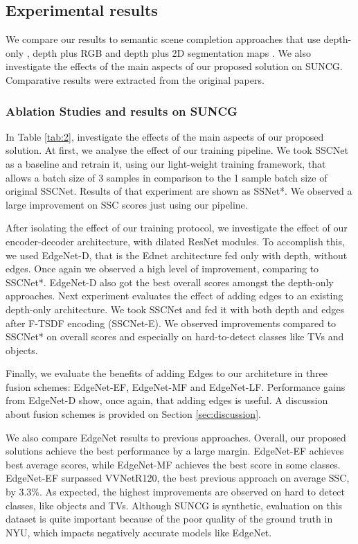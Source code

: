 \subsection{Experimental results}

We compare our results to semantic scene completion approaches that use depth-only \cite{guo_view-volume_2018,song_semantic_2017,zhang_semantic_2018}, depth plus RGB \cite{guedes_semantic_2018} and depth plus 2D segmentation maps \cite{garbade_two_2018,See_and_think_2018}. We also investigate the effects of the main aspects of our proposed solution on SUNCG. Comparative results were extracted from the original papers.

\subsubsection {Ablation Studies and results on SUNCG}

 In Table \ref{tab:2}, investigate the effects of the main aspects of our proposed solution. At first, we analyse the effect of our training pipeline. We took SSCNet as a baseline and retrain it, using our light-weight training framework, that allows a batch size of 3 samples in comparison to the 1 sample batch size of original SSCNet. Results of that experiment are shown as SSNet*. We observed a large improvement on SSC scores just using our pipeline.

After isolating the effect of our training protocol, we investigate the effect of our encoder-decoder architecture, with dilated ResNet modules. To accomplish this, we used EdgeNet-D, that is the Ednet architecture fed only with depth, without edges. Once again we observed a high level of improvement, comparing to SSCNet*. EdgeNet-D also got the best overall scores amongst the depth-only approaches. Next experiment evaluates the effect of adding edges to an existing depth-only architecture. We took SSCNet and fed it with both depth and edges after F-TSDF encoding (SSCNet-E). We observed improvements compared to SSCNet* on overall scores and especially on hard-to-detect classes like TVs and objects.

Finally, we evaluate the benefits of adding Edges to our architeture in three fusion schemes: EdgeNet-EF, EdgeNet-MF and EdgeNet-LF.  Performance gains from EdgeNet-D show, once again, that adding edges is useful. A discussion about fusion schemes is provided on Section \ref{sec:discussion}. 

We also compare EdgeNet results to previous approaches. Overall, our proposed solutions achieve the best performance by a large margin. EdgeNet-EF achieves best average scores, while EdgeNet-MF achieves the best score in some classes. EdgeNet-EF surpassed VVNetR120, the best previous approach on average SSC, by 3.3\%. As expected, the highest improvements are observed on hard to detect classes, like objects and TVs. Although SUNCG is synthetic, evaluation on this dataset is quite important because of the poor quality of the ground truth in NYU, which impacts negatively accurate models like EdgeNet.


